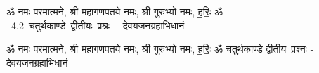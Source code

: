 \documentclass[17pt]{extarticle}
\begin{document}
\begin{titlepage}
    \begin{center}
 
\begin{sanskrit}
    { \Large
    ॐ नमः परमात्मने, श्री महागणपतये नमः, 
श्री गुरुभ्यो नमः, ह॒रिः॒ ॐ 
    }
    \\
    \vspace{2.5cm}
    \mbox{ \Huge
    4.2      चतुर्थकाण्डे द्वीतीयः प्रश्नः - देवयजनग्रहाभिधानं   }
\end{sanskrit}
\end{center}

\end{titlepage}
\tableofcontents

ॐ नमः परमात्मने, श्री महागणपतये नमः, 
श्री गुरुभ्यो नमः, ह॒रिः॒ ॐ       चतुर्थकाण्डे द्वीतीयः प्रश्नः - देवयजनग्रहाभिधानं \newline

\end{document}
